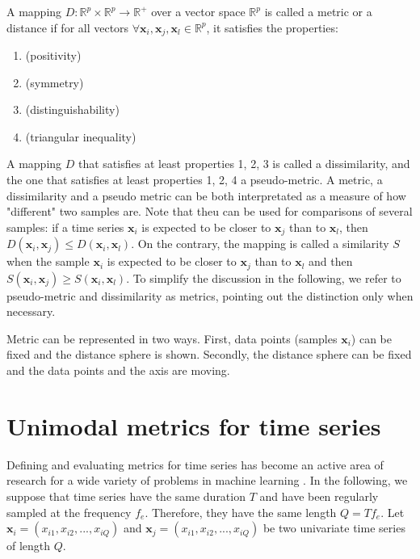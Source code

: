 A mapping $D:\mathbb{R}^p \times \mathbb{R}^p \rightarrow \mathbb{R}^+$ over a vector space $\mathbb{R}^p$ is called a metric or a distance if for all vectors $\forall \textbf{x}_i, \textbf{x}_j, \textbf{x}_l \in \mathbb{R}^p$, it satisfies the properties:
\begin{enumerate}
	\item { (positivity)}
	\item { (symmetry)}	
	\item { (distinguishability)}
	\item { (triangular inequality)}
\end{enumerate}
A mapping $D$ that satisfies at least properties 1, 2, 3 is called a dissimilarity, and the one that satisfies at least properties 1, 2, 4 a pseudo-metric. A metric, a dissimilarity and a pseudo metric can be both interpretated as a measure of how "different" two samples are. Note that theu can be used for comparisons of several samples: if a time series $\textbf{x}_i$ is expected to be closer to $\textbf{x}_j$ than to $\textbf{x}_l$, then $D(\textbf{x}_i,\textbf{x}_j) \leq D(\textbf{x}_i,\textbf{x}_l)$. On the contrary, the mapping is called a similarity $S$ when the sample $\textbf{x}_i$ is expected to be closer to $\textbf{x}_j$ than to $\textbf{x}_l$ and then $S(\textbf{x}_i,\textbf{x}_j) \geq S(\textbf{x}_i,\textbf{x}_l)$. To simplify the discussion in the following, we refer to pseudo-metric and dissimilarity as metrics, pointing out the distinction only when necessary.

Metric can be represented in two ways. First, data points (samples $\textbf{x}_i$) can be fixed and the distance sphere is shown. Secondly, the distance sphere can be fixed and the data points and the axis are moving.




\section{Unimodal metrics for time series}
Defining and evaluating metrics for time series has become an active area of research for a wide variety of problems in machine learning \cite{Ding2008, Najmeddine2012}. In the following, we suppose that time series have the same duration $T$ and have been regularly sampled at the frequency $f_e$. Therefore, they have the same length $Q=Tf_e$. Let $\textbf{x}_i=(x_{i1}, x_{i2}, ..., x_{iQ})$ and $\textbf{x}_j=(x_{i1}, x_{i2}, ..., x_{iQ})$ be two univariate time series of length $Q$. 

